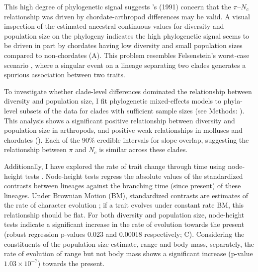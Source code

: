 \documentclass[9pt,lineno]{elife}
\begin{document}
This high degree of phylogenetic signal suggests
\citeauthor{Gillespie1991-qa}'s (1991) concern that the $\pi$--$N_c$
relationship was driven by chordate-arthropod differences may be valid. A
visual inspection of the estimated ancestral continuous values for diversity
and population size on the phylogeny indicates the high phylogenetic signal
seems to be driven in part by chordates having low diversity and small
population sizes compared to non-chordates (A). This
problem resembles Felsenstein's worst-case scenario
\citep{Felsenstein1985-an,Uyeda2018-wf}, where a singular event on a
lineage separating two clades generates a spurious association between two
traits. 

To investigate whether clade-level differences dominated the relationship
between diversity and population size, I fit phylogenetic mixed-effects models
to phyla-level subsets of the data for clades with sufficient sample sizes (see
Methods: ). This analysis shows a significant positive
relationship between diversity and population size in arthropods, and positive
weak relationships in molluscs and chordates
(). Each of the 90\% credible intervals
for slope overlap, suggesting the relationship between $\pi$ and $N_c$ is
similar across these clades.

Additionally, I have explored the rate of trait change through time using
node-height tests \citep{Freckleton2006-ww}. Node-height tests regress the
absolute values of the standardized contrasts between lineages against the
branching time (since present) of these lineages. Under Brownian Motion (BM),
standardized contrasts are estimates of the rate of character evolution
\citep{Felsenstein1985-an}; if a trait evolves under constant rate BM, this
relationship should be flat. For both diversity and population size,
node-height tests indicate a significant increase in the rate of evolution
towards the present (robust regression p-values 0.023 and 0.00018 respectively;
C). Considering the constituents of the population
size estimate, range and body mass, separately, the rate of evolution of range
but not body mass shows a significant increase (p-value $1.03 \times 10^{-7}$)
towards the present. 
\end{document}
